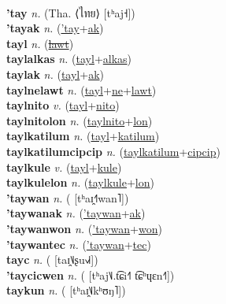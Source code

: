  \label{'ta} \\
\textbf{'tay} \textit{n.} (Tha. ⟨ไทย⟩ [tʰaj˧])
 \label{'tay} \\
\textbf{'tayak} \textit{n.} (\hyperref['tay]{'tay}+\hyperref[ak]{ak})
 \label{'tayak} \\
\textbf{tayl} \textit{n.} (\hyperref[lawt]{\sout{lawt}})
 \label{tayl} \\
\textbf{taylalkas} \textit{n.} (\hyperref[tayl]{tayl}+\hyperref[alkas]{alkas})
 \label{taylalkas} \\
\textbf{taylak} \textit{n.} (\hyperref[tayl]{tayl}+\hyperref[ak]{ak})
 \label{taylak} \\
\textbf{taylnelawt} \textit{n.} (\hyperref[tayl]{tayl}+\hyperref[ne]{ne}+\hyperref[lawt]{lawt})
 \label{taylnelawt} \\
\textbf{taylnito} \textit{v.} (\hyperref[tayl]{tayl}+\hyperref[nito]{nito})
 \label{taylnito} \\
\textbf{taylnitolon} \textit{n.} (\hyperref[taylnito]{taylnito}+\hyperref[lon]{lon})
 \label{taylnitolon} \\
\textbf{taylkatilum} \textit{n.} (\hyperref[tayl]{tayl}+\hyperref[katilum]{katilum})
 \label{taylkatilum} \\
\textbf{taylkatilumcipcip} \textit{n.} (\hyperref[taylkatilum]{taylkatilum}+\hyperref[cipcip]{cipcip})
 \label{taylkatilumcipcip} \\
\textbf{taylkule} \textit{v.} (\hyperref[tayl]{tayl}+\hyperref[kule]{kule})
 \label{taylkule} \\
\textbf{taylkulelon} \textit{n.} (\hyperref[taylkule]{taylkule}+\hyperref[lon]{lon})
 \label{taylkulelon} \\
\textbf{'taywan} \textit{n.} ( [tʰaɪ̯˧˥wan˥])
 \label{'taywan} \\
\textbf{'taywanak} \textit{n.} (\hyperref['taywan]{'taywan}+\hyperref[ak]{ak})
 \label{'taywanak} \\
\textbf{'taywanwon} \textit{n.} (\hyperref['taywan]{'taywan}+\hyperref[won]{won})
 \label{'taywanwon} \\
\textbf{'taywantec} \textit{n.} (\hyperref['taywan]{'taywan}+\hyperref[tec]{tec})
 \label{'taywantec} \\
\textbf{tayc} \textit{n.} ( [taɪ̯˥˩ʂu˧˩˧])
 \label{tayc} \\
\textbf{'taycicwen} \textit{n.} ( [tʰaj˥˩.t͡ɕi˧˥ t͡ɕʰɥɛn˧˥])
 \label{'taycicwen} \\
\textbf{taykun} \textit{n.} ( [tʰaɪ̯˥˩kʰʊŋ˥])
 \label{taykun} \\
